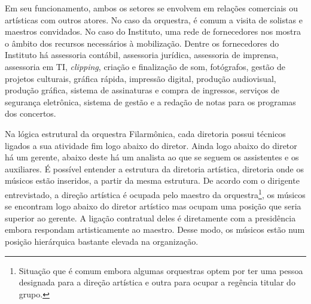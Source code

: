 \documentclass[a4paper, 12pt, openright, oneside, german, french, english, brazil]{abntex2}
\begin{document}







	Em seu funcionamento, ambos os setores se envolvem em relações comerciais ou artísticas com outros atores. No caso da orquestra, é comum a visita de solistas e maestros convidados. No caso do Instituto, uma rede de fornecedores nos mostra o âmbito dos recursos necessários à mobilização. Dentre os fornecedores do Instituto há assessoria contábil, assessoria jurídica, assessoria de imprensa, assessoria em TI, \textit{clipping}, criação e finalização de som, fotógrafos, gestão de projetos culturais, gráfica rápida, impressão digital, produção audiovisual, produção gráfica, sistema de assinaturas e compra de ingressos, serviços de segurança eletrônica, sistema de gestão e a redação de notas para os programas dos concertos.

	
	Na lógica estrutural da orquestra Filarmônica, cada diretoria possui técnicos ligados a sua atividade fim logo abaixo do diretor. Ainda logo abaixo do diretor há um gerente, abaixo deste há um analista ao que se seguem os assistentes e os auxiliares. É possível entender a estrutura da diretoria artística, diretoria onde os músicos estão inseridos, a partir da mesma estrutura. De acordo com o dirigente entrevistado, a direção artística é ocupada pelo maestro da orquestra\footnote{Situação que é comum embora algumas orquestras optem por ter uma pessoa designada para a direção artística e outra para ocupar a regência titular do grupo.}, os músicos se encontram logo abaixo do diretor artístico mas ocupam uma posição que seria superior ao gerente. A ligação contratual deles é diretamente com a presidência embora respondam artisticamente ao maestro. Desse modo, os músicos estão num posição hierárquica bastante elevada na organização.




\end{document}

